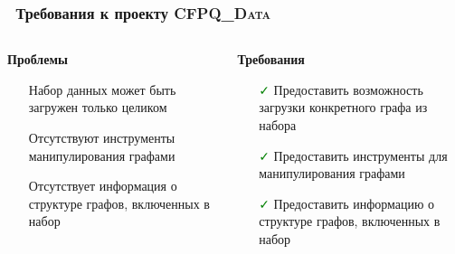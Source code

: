 \begin{frame}[fragile]
	\transwipe[direction=90]
	\frametitle{\faLegal\ Требования к проекту \textsc{CFPQ\_Data}}
	
	\begin{columns}
        \begin{column}{0.5\textwidth}
            \textbf{Проблемы}
            \begin{itemize}
                \item[\textcolor{red}{\faQuestion}] Набор данных может быть загружен только целиком
                \item[\textcolor{red}{\faQuestion}] Отсутствуют инструменты манипулирования графами
                \item[\textcolor{red}{\faQuestion}] Отсутствует информация о структуре графов, включенных в набор
            \end{itemize}
        \end{column}

        \begin{column}{0.5\textwidth}
            \textbf{Требования}
            \begin{itemize} 
        	    \item[\textcolor{green}{\faCheck}] Предоставить возможность загрузки конкретного графа из набора
                \item[\textcolor{green}{\faCheck}] Предоставить инструменты для манипулирования графами
                \item[\textcolor{green}{\faCheck}] Предоставить информацию о структуре графов, включенных в набор
            \end{itemize}
        \end{column}
    \end{columns}
\end{frame}
